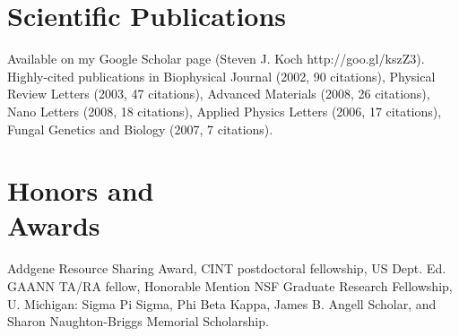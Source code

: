 \documentclass[margin,line]{resume}
\begin{document}
\begin{resume}
    \section{\mysidestyle Scientific Publications}
    
    Available on my Google Scholar page (Steven J. Koch http://goo.gl/kszZ3).  Highly-cited publications in Biophysical Journal (2002, 90 citations), Physical Review Letters (2003, 47 citations), Advanced Materials (2008, 26 citations), Nano Letters (2008, 18 citations), Applied Physics Letters (2006, 17 citations), Fungal Genetics and Biology (2007, 7 citations).
    
    
    \section{\mysidestyle Honors and\\Awards} 

    Addgene Resource Sharing Award, CINT postdoctoral fellowship, US Dept. Ed. GAANN TA/RA fellow, Honorable Mention NSF Graduate Research Fellowship, U. Michigan: Sigma Pi Sigma, Phi Beta Kappa, James B. Angell Scholar, and Sharon Naughton-Briggs Memorial Scholarship.     


\end{resume}
\end{document}
